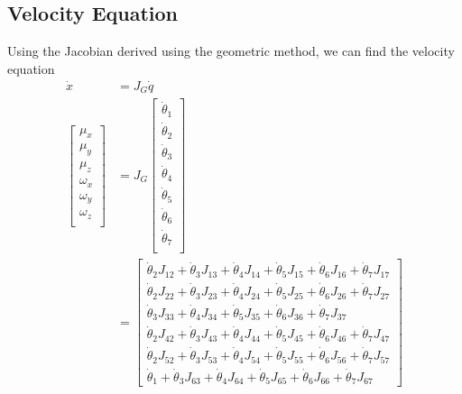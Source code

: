 \documentclass{article}
\begin{document}
\subsection{Velocity Equation}
Using the Jacobian derived using the geometric method, we can find the velocity equation
\begin{align*}
\dot{x} &= J_G \dot{q} \\
\left[\begin{matrix}
\mu_x \\
\mu_y \\
\mu_z \\
\omega_x \\
\omega_y \\
\omega_z \\
\end{matrix}\right]
&= J_G
\left[\begin{matrix}
\dot{\theta}_1 \\
\dot{\theta}_2 \\
\dot{\theta}_3 \\
\dot{\theta}_4 \\
\dot{\theta}_5 \\
\dot{\theta}_6 \\
\dot{\theta}_7 \\
\end{matrix}\right] \\
&=
\left[\begin{matrix}
\dot{\theta}_{2} J_{12} + \dot{\theta}_{3} J_{13} + \dot{\theta}_{4} J_{14} + \dot{\theta}_{5} J_{15} + \dot{\theta}_{6} J_{16} + \dot{\theta}_{7} J_{17}\\
\dot{\theta}_{2} J_{22} + \dot{\theta}_{3} J_{23} + \dot{\theta}_{4} J_{24} + \dot{\theta}_{5} J_{25} + \dot{\theta}_{6} J_{26} + \dot{\theta}_{7} J_{27}\\
\dot{\theta}_{3} J_{33} + \dot{\theta}_{4} J_{34} + \dot{\theta}_{5} J_{35} + \dot{\theta}_{6} J_{36} + \dot{\theta}_{7} J_{37}\\
\dot{\theta}_{2} J_{42} + \dot{\theta}_{3} J_{43} + \dot{\theta}_{4} J_{44} + \dot{\theta}_{5} J_{45} + \dot{\theta}_{6} J_{46} + \dot{\theta}_{7} J_{47}\\
\dot{\theta}_{2} J_{52} + \dot{\theta}_{3} J_{53} + \dot{\theta}_{4} J_{54} + \dot{\theta}_{5} J_{55} + \dot{\theta}_{6} J_{56} + \dot{\theta}_{7} J_{57}\\
\dot{\theta}_{1} + \dot{\theta}_{3} J_{63} + \dot{\theta}_{4} J_{64} + \dot{\theta}_{5} J_{65} + \dot{\theta}_{6} J_{66} + \dot{\theta}_{7} J_{67}
\end{matrix}\right]
\end{align*}
\end{document}
